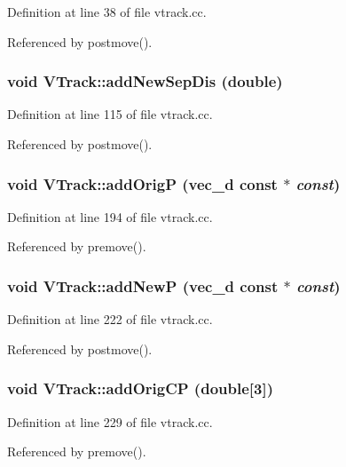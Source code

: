 Definition at line 38 of file vtrack.cc.

Referenced by postmove().
\subsubsection{\setlength{\rightskip}{0pt plus 5cm}void VTrack::add\-New\-Sep\-Dis (double)}\label{classVTrack_67a17c76271d4ae43736ca23e6d06a67}




Definition at line 115 of file vtrack.cc.

Referenced by postmove().
\subsubsection{\setlength{\rightskip}{0pt plus 5cm}void VTrack::add\-Orig\-P ({\bf vec\_\-d} const $\ast$ {\em const})}\label{classVTrack_aa3b7b2b501c7d23a3509c89ae617c26}




Definition at line 194 of file vtrack.cc.

Referenced by premove().
\subsubsection{\setlength{\rightskip}{0pt plus 5cm}void VTrack::add\-New\-P ({\bf vec\_\-d} const $\ast$ {\em const})}\label{classVTrack_45a34666d8cd52ec28164f8c1bc5f754}




Definition at line 222 of file vtrack.cc.

Referenced by postmove().
\subsubsection{\setlength{\rightskip}{0pt plus 5cm}void VTrack::add\-Orig\-CP (double[3])}\label{classVTrack_f13f7d2b9207e392ed9c17f1ed617aed}




Definition at line 229 of file vtrack.cc.

Referenced by premove().

